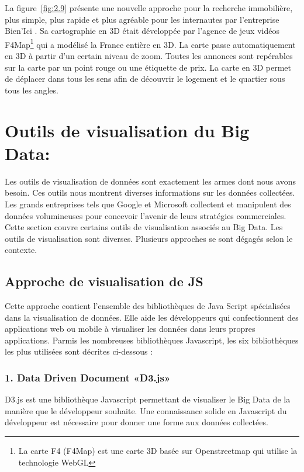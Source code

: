 \documentclass[french, a4paper, 12pt]{report}
\begin{document}
La figure~\ref{fig:2.9} présente une nouvelle approche pour la recherche immobilière, plus simple, plus rapide et plus agréable pour les internautes par l’entreprise Bien’Ici . Sa cartographie en 3D était développée par l’agence de jeux vidéos F4Map\footnote{ La carte F4 (F4Map) est une carte 3D basée sur Openstreetmap qui utilise la technologie WebGL } qui a modélisé la France entière en 3D. La carte passe automatiquement en 3D à partir d’un certain niveau de zoom. Toutes les annonces sont repérables sur la carte par un point rouge ou une étiquette de prix.  La carte en 3D permet de déplacer dans tous les sens afin de découvrir le logement et le quartier sous tous les angles.


\section{Outils de visualisation du Big Data: }
Les outils de visualisation de données sont exactement les armes dont nous avons besoin. Ces outils nous montrent diverses informations sur les données collectées. Les grands entreprises tels que Google et Microsoft collectent et manipulent des données volumineuses pour concevoir l'avenir de leurs stratégies commerciales. Cette section couvre certains outils de visualisation associés au Big Data. Les outils de visualisation sont diverses.  Plusieurs approches se sont dégagés selon le contexte. \\

\subsection{Approche de visualisation de JS}
\label{subsec:JS}
Cette approche contient l’ensemble des bibliothèques de Java Script spécialisées dans la visualisation de données. Elle aide les développeurs qui confectionnent des applications web ou mobile à visualiser les données dans leurs propres applications. 
Parmis les nombreuses bibliothèques Javascript, les six bibliothèques les plus utilisées sont décrites ci-dessous : 
\subsubsection{1. Data Driven Document «D3.js»}
D3.js est une bibliothèque Javascript permettant de visualiser le Big Data de la manière que le développeur souhaite. Une connaissance solide en Javascript du développeur est nécessaire pour donner une forme aux données collectées. 
\end{document}
